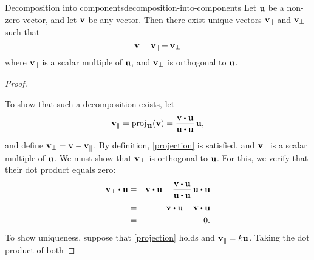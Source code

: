 \begin{theorem}{Decomposition into components}{decomposition-into-components}
  Let $\mbox{\bf u}$ be a non-zero vector, and let $\mbox{\bf v}$ be any
  vector. Then there exist unique vectors $\mbox{\bf v}_{\|}$ and
  $\mbox{\bf v}_{\bot}$ such that
  \begin{equation}\label{projection}
    \mbox{\bf v}=\mbox{\bf v}_{\|}+\mbox{\bf v}_{\bot }  
  \end{equation}
  where $\mbox{\bf v}_{\|}$ is a scalar multiple of $\mbox{\bf u}$, 
  and $\mbox{\bf v}_{\bot}$ is orthogonal to $\mbox{\bf u}$.
\end{theorem}

\begin{proof}
  \begin{center}
  \end{center}
  To show that such a decomposition exists, let
  \begin{equation*}
    \vect{v}_{\coll} = \proj_{\vect{u}}(\vect{v}) = \frac{\vect{v}\dotprod \vect{u}}{\vect{u}\dotprod \vect{u}}\, \vect{u},
  \end{equation*}
  and define $\mbox{\bf v}_{\bot} = \mbox{\bf v}-\mbox{\bf v}_{\|}$. By
  definition, {\eqref{projection}} is satisfied, and
  $\mbox{\bf v}_{\|}$ is a scalar multiple of $\mbox{\bf u}$. We must show
  that $\mbox{\bf v}_{\bot}$ is orthogonal to $\mbox{\bf u}$. For this,  
  we verify that their dot product equals zero:
  \begin{eqnarray*}
    \vect{v}_{\bot }\dotprod \vect{u}
    &=& \vect{v}\dotprod \vect{u}-\frac{\vect{v}\dotprod \vect{u}}{\vect{u}\dotprod\vect{u}}\,\vect{u}\dotprod \vect{u} \\
    &=& \vect{v}\dotprod\vect{u}-\vect{v}\dotprod \vect{u}\\
    &=& 0.
  \end{eqnarray*}
  To show uniqueness, suppose that {\eqref{projection}} holds and
  $\mbox{\bf v}_{\|}= k \mbox{\bf u}$.  Taking the dot product of both

\end{proof}
